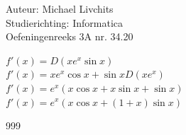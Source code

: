 \documentclass[a4paper]{article}
\begin{document}
  
\noindent \large Auteur: Michael Livchits \\
\noindent \large Studierichting: Informatica\\
\noindent \large Oefeningenreeks 3A nr. 34.20\\

\medskip

\normalsize

$f'(x) = D\left(xe^x \sin x\right)$\\

$f'(x) = xe^x \cos x + \sin x D(xe^x)$\\

$f'(x) = e^x(x\cos x + x\sin x + \sin x)$\\

$f'(x) = e^x(x\cos x + (1+x)\sin x)$\\

\begin{thebibliography}{999}
\end{thebibliography}
\end{document}
